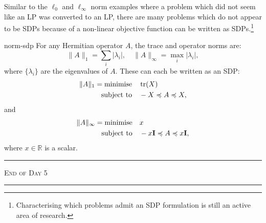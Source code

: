 Similar to the $\ell_{0}$ and $\ell_{\infty}$ norm examples where a problem which did not seem like an LP was converted to an LP, there are many problems which do not appear to be SDPs because of a non-linear objective function can be written as SDPs.\footnote{Characterising which problems admit an SDP formulation is still an active area of research.}

\begin{prf}{norm-sdp}
    For any Hermitian operator $A$, the trace and operator norms are:
    \[
        \|A\|_1 = \sum_{i}|\lambda_i|, \quad \|A\|_\infty = \max_i|\lambda_i|,
    \]
    where $\{\lambda_i\}$ are the eigenvalues of $A$. These can each be written as an SDP:
    \begin{align}
        \|A\|_1
        = \text{minimise} \quad & \tr(X)          \\
        \text{subject to} \quad & -X \preccurlyeq A \preccurlyeq X,
    \end{align}
    and
    \begin{align}
        \|A\|_\infty
        = \text{minimise} \quad & x                                   \\
        \text{subject to} \quad & -x\mathbf{I} \preccurlyeq A \preccurlyeq x\mathbf{I},
    \end{align}
    where $x \in \mathbb{R}$ is a scalar.
\end{prf}

\begin{center}
    {\color{quantumdeep}
        \rule{\linewidth}{0.6pt}

        \scshape\Large End of Day 5

        \rule{\linewidth}{0.6pt}}
\end{center}


